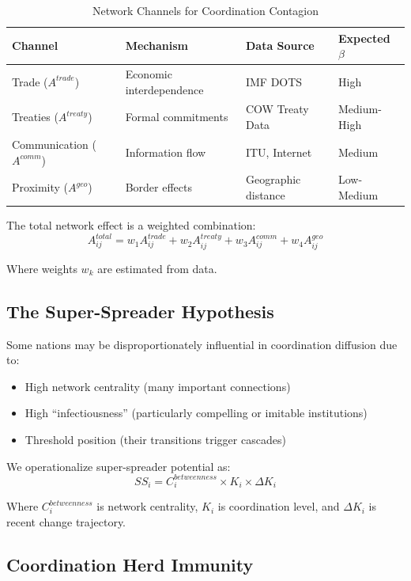 \documentclass[12pt,a4paper]{article}
\begin{document}
\begin{table}[H]
\centering
\caption{Network Channels for Coordination Contagion}
\label{tab:channels}
\begin{tabular}{llll}
\toprule
\textbf{Channel} & \textbf{Mechanism} & \textbf{Data Source} & \textbf{Expected $\beta$} \\
\midrule
Trade ($A^{trade}$) & Economic interdependence & IMF DOTS & High \\
Treaties ($A^{treaty}$) & Formal commitments & COW Treaty Data & Medium-High \\
Communication ($A^{comm}$) & Information flow & ITU, Internet & Medium \\
Proximity ($A^{geo}$) & Border effects & Geographic distance & Low-Medium \\
\bottomrule
\end{tabular}
\end{table}

The total network effect is a weighted combination:
\begin{equation}
A_{ij}^{total} = w_1 A_{ij}^{trade} + w_2 A_{ij}^{treaty} + w_3 A_{ij}^{comm} + w_4 A_{ij}^{geo}
\end{equation}

Where weights $w_k$ are estimated from data.

\subsection{The Super-Spreader Hypothesis}

Some nations may be disproportionately influential in coordination diffusion due to:
\begin{itemize}
    \item High network centrality (many important connections)
    \item High ``infectiousness'' (particularly compelling or imitable institutions)
    \item Threshold position (their transitions trigger cascades)
\end{itemize}

We operationalize super-spreader potential as:
\begin{equation}
SS_i = C_i^{betweenness} \times K_i \times \Delta K_i
\end{equation}

Where $C_i^{betweenness}$ is network centrality, $K_i$ is coordination level, and $\Delta K_i$ is recent change trajectory.

\subsection{Coordination Herd Immunity}
\end{document}
